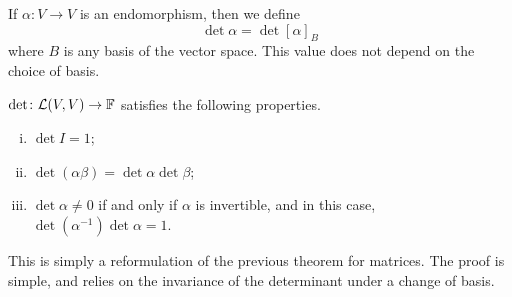\documentclass[a4paper,11pt]{article}
\begin{document}
\begin{definition}
	If $ \alpha :V\to V $ is an endomorphism, then we define
	\[
		\det \alpha = \det [\alpha]_{B}
	\]
	where $ B $ is any basis of the vector space.
	This value does not depend on the choice of basis.
\end{definition}

\begin{theorem}
	$ \det \colon {\mathcal{L}}(V,V) \to {\mathbb{F}} $ satisfies the following properties.
	\begin{enumerate}[(i)]
		\item $ \det I = 1 $;
		\item $ \det (\alpha\beta) = \det\alpha \det\beta $;
		\item $ \det \alpha \neq 0 $ if and only if $ \alpha $ is invertible, and in this case, $ \det(\alpha^{-1}) \det \alpha = 1 $.
	\end{enumerate}
\end{theorem}
This is simply a reformulation of the previous theorem for matrices.
The proof is simple, and relies on the invariance of the determinant under a change of basis.
\end{document}
